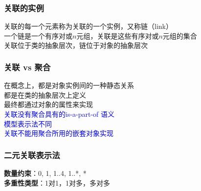 \documentclass[compress]{beamer}
\begin{document}
\begin{frame}
  \frametitle{关联的实例}
  关联的每一个元素称为关联的一个实例，又称链（link） \\

  一个链是一个有序对或$n$元组，关联是这些有序对或$n$元组的集合 \\

  关联位于类的抽象层次，链位于对象的抽象层次

\end{frame}

\begin{frame}
  \frametitle{关联 vs 聚合}
  在概念上，都是对象实例间的一种静态关系 \\
  都是在类的抽象层次上定义 \\
  最终都通过对象的属性来实现 \\[2ex]
  \textcolor{blue}{关联没有聚合具有的is-a-part-of 语义} \\
  \textcolor{blue}{模型表示法不同} \\
  \textcolor{blue}{关联不能用聚合所用的嵌套对象实现} \\[2ex]

\end{frame}

\begin{frame}
  \frametitle{二元关联表示法}
  \centering{}

  \vspace*{2ex}
  \textbf{数量约束}：0, 1, 1..4, 1..*, * \\
  \textbf{多重性类型}：1对1，1对多，多对多
\end{frame}
\end{document}

